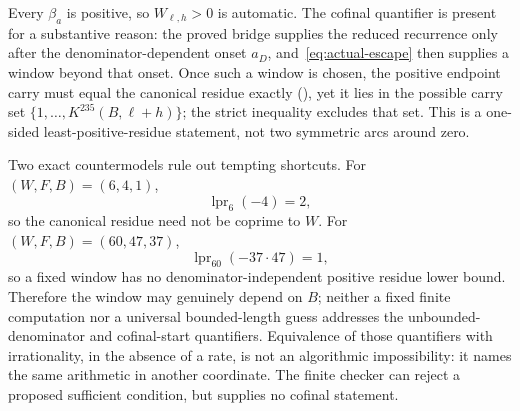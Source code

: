 Every $\beta_a$ is positive, so $W_{\ell,h}>0$ is automatic.  The cofinal
quantifier is present for a substantive reason: the proved bridge supplies
the reduced recurrence only after the denominator-dependent onset $a_D$,
and~\eqref{eq:actual-escape} then supplies a window beyond that onset.
Once such a window is chosen, the positive endpoint carry must equal the
canonical residue exactly
(),
yet it lies in the possible carry set
$\{1,\ldots,K^{235}(B,\ell+h)\}$; the strict inequality excludes that set.
This is a one-sided least-positive-residue statement, not two symmetric arcs
around zero.

Two exact countermodels rule out tempting shortcuts.  For $(W,F,B)=(6,4,1)$,
\[
 \operatorname{lpr}_{6}(-4)=2,
\]
so the canonical residue need not be coprime to $W$.  For
$(W,F,B)=(60,47,37)$,
\[
 \operatorname{lpr}_{60}(-37\cdot47)=1,
\]
so a fixed window has no denominator-independent positive residue lower
bound.  Therefore the window may genuinely depend on $B$; neither a fixed
finite computation nor a universal bounded-length guess addresses the
unbounded-denominator and cofinal-start quantifiers.  Equivalence of those
quantifiers with irrationality, in the absence of a rate, is not an
algorithmic impossibility: it names the same arithmetic in another
coordinate.  The finite checker can reject a proposed sufficient condition,
but supplies no cofinal statement.
